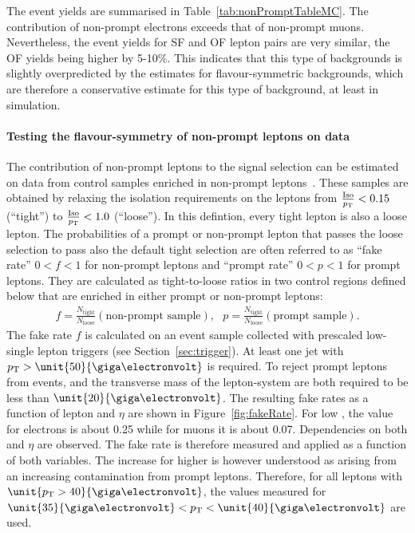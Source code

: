 The event yields are summarised in Table~\ref{tab:nonPromptTableMC}. The contribution of non-prompt electrons exceeds that of non-prompt muons. Nevertheless, the event yields for SF and OF lepton pairs are very similar, the OF yields being higher by 5-10\%. This indicates that this type of backgrounds is slightly overpredicted by the estimates for flavour-symmetric backgrounds, which are therefore a conservative estimate for this type of background, at least in simulation. 


\paragraph*{Testing the flavour-symmetry of non-prompt leptons on data}
The contribution of non-prompt leptons to the signal selection can be estimated on data from control samples enriched in non-prompt leptons~\cite{fakesnote1,fakesnote2}. These samples are obtained by relaxing the isolation requirements on the leptons from $\frac{\text{Iso}}{p_{\mathrm{T}}} < 0.15$ (``tight'') to $\frac{\text{Iso}}{p_{\mathrm{T}}}<1.0$ (``loose''). In this defintion, every tight lepton is also a loose lepton. The probabilities of a prompt or non-prompt lepton that passes the loose selection to pass also the default tight selection are often referred to as ``fake rate'' $0 < f< 1$ for non-prompt leptons and ``prompt rate'' $0< p< 1$ for prompt leptons. They are calculated as tight-to-loose ratios in two control regions defined below that are enriched in either prompt or non-prompt leptons:
\begin{eqnarray}
f = \frac{N_{\text{tight}}}{N_{\text{loose}}} (\text{non-prompt sample}),\text{                }  p = \frac{N_{\text{tight}}}{N_{\text{loose}}} (\text{prompt sample}).
\end{eqnarray} 
The fake rate $f$ is calculated on an event sample collected with prescaled low-\pt single lepton triggers (see Section~\ref{sec:trigger}). At least one jet with $\pt > \unit{50}{\giga\electronvolt}$ is required. To reject prompt leptons from \Wjets events, \MET and the transverse mass of the lepton-\MET system are both required to be less than $\unit{20}{\giga\electronvolt}$. The resulting fake rates as a function of lepton \pt and $\eta$ are shown in Figure~\ref{fig:fakeRate}. For low \pt, the value for electrons is about 0.25 while for muons it is about 0.07. Dependencies on both \pt and $\eta$ are observed. The fake rate is therefore measured and applied as a function of both variables. The increase for higher \pt is however understood as arising from an increasing contamination from prompt leptons. Therefore, for all leptons with $\unit{\pt > 40}{\giga\electronvolt}$, the values measured for $\unit{35}{\giga\electronvolt} < \pt < \unit{40}{\giga\electronvolt}$ are used.  

